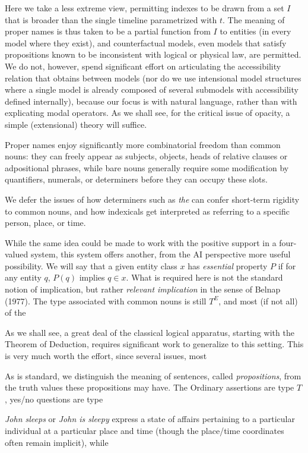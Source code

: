 Here we take a less extreme view, permitting indexes to be drawn from a set
$I$ that is broader than the single timeline parametrized with $t$.  The
meaning of proper names is thus taken to be a partial function from $I$ to
entities (in every model where they exist), and counterfactual models, even
models that satisfy propositions known to be inconsistent with logical or
physical law, are permitted. We do not, however, spend significant effort on
articulating the accessibility relation that obtains between models (nor do we
use intensional model structures where a single model is already composed of
several submodels with accessibility defined internally), because our focus is
with natural language, rather than with explicating modal operators. As we
shall see, for the critical issue of opacity, a simple (extensional) theory
will suffice. 

Proper names enjoy significantly more combinatorial freedom than common nouns:
they can freely appear as subjects, objects, heads of relative clauses or
adpositional phrases, while bare nouns generally require some modification by
quantifiers, numerals, or determiners before they can occupy these slots. 

We defer the issues of how determiners such as {\it the} can confer short-term
rigidity to common nouns, and how indexicals get interpreted as referring to a
specific person, place, or time.

While the same idea could be made to work with the
positive support in a four-valued system, this system offers another, from the
AI perspective more useful possibility. We will say that a given entity class
$x$ has {\it essential} property $P$ if for any entity $q$, $P(q)$ implies $q
\in x$. What is required here is not the standard notion of implication, but
rather {\it relevant implication} in the sense of Belnap (1977).  The type
associated with common nouns is still $T^E$, and most (if not all) of the


As we shall see, a great deal of the classical logical apparatus, starting
with the Theorem of Deduction, requires significant work to generalize to this
setting. This is very much worth the effort, since several issues, most

As is standard, we distinguish the meaning of sentences, called {\it
  propositions}, from the truth values these propositions may have. The
Ordinary assertions are type $T$, yes/no questions are type

{\it John sleeps} or
{\it John is sleepy} express a state of affairs pertaining to a particular
individual at a particular place and time (though the place/time coordinates
often remain implicit), while

